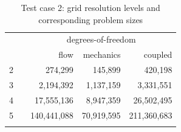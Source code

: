 \begin{table}
    \centering
    \caption[Test case 2 grid and problem sizes]{Test case 2: grid resolution levels and corresponding problem sizes}
    \label{tab:mazumodel2_par_dims}
    \begin{tabular}{crrrr}
      \hline\noalign{\smallskip}
      \multirow{2}{*}{$\ell$} & & \multicolumn{3}{c}{degrees-of-freedom} \\
      \noalign{\smallskip}\cline{3-5}\noalign{\smallskip}
      & & flow & mechanics & coupled \\
      \hline\noalign{\smallskip}
        2 & &     274,299 &    145,899 &     420,198 \\
        3 & &   2,194,392 &  1,137,159 &   3,331,551 \\
        4 & &  17,555,136 &  8,947,359 &  26,502,495 \\
        5 & & 140,441,088 & 70,919,595 & 211,360,683 \\
      \hline\noalign{\smallskip}
    \end{tabular}
\end{table}


